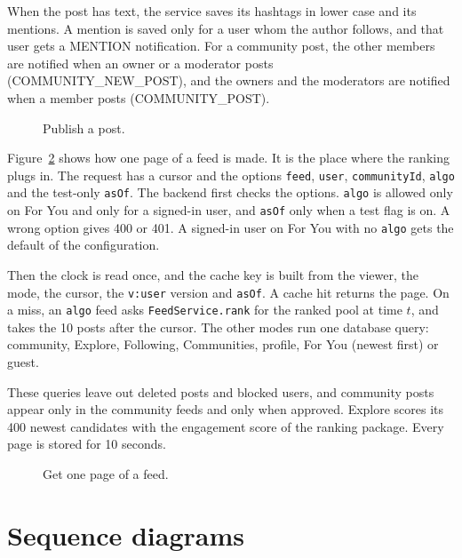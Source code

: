 When the post has text, the service saves its hashtags in lower case and its mentions. A mention is saved only for a user whom the author follows, and that user gets a MENTION notification. For a community post, the other members are notified when an owner or a moderator posts (COMMUNITY\_NEW\_POST), and the owners and the moderators are notified when a member posts (COMMUNITY\_POST).

\begin{figure}[htbp]
  \centering
  \caption{Publish a post.}
  \label{fig:design-publish}
\end{figure}

Figure~\ref{fig:design-feedpage} shows how one page of a feed is made. It is the place where the ranking plugs in. The request has a cursor and the options \texttt{feed}, \texttt{user}, \texttt{communityId}, \texttt{algo} and the test-only \texttt{asOf}. The backend first checks the options. \texttt{algo} is allowed only on For You and only for a signed-in user, and \texttt{asOf} only when a test flag is on. A wrong option gives 400 or 401. A signed-in user on For You with no \texttt{algo} gets the default of the configuration.

Then the clock is read once, and the cache key is built from the viewer, the mode, the cursor, the \texttt{v:user} version and \texttt{asOf}. A cache hit returns the page. On a miss, an \texttt{algo} feed asks \texttt{FeedService.rank} for the ranked pool at time $t$, and takes the 10 posts after the cursor. The other modes run one database query: community, Explore, Following, Communities, profile, For You (newest first) or guest.

These queries leave out deleted posts and blocked users, and community posts appear only in the community feeds and only when approved. Explore scores its 400 newest candidates with the engagement score of the ranking package. Every page is stored for 10 seconds.

\begin{figure}[htbp]
  \centering
  \caption{Get one page of a feed.}
  \label{fig:design-feedpage}
\end{figure}

\section{Sequence diagrams}
\label{sec:design-sequence}

